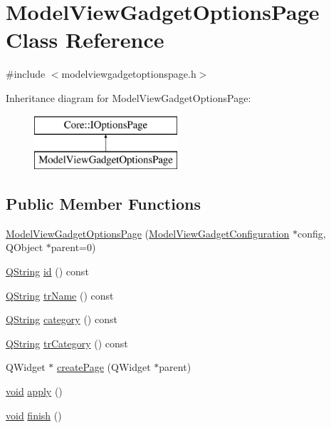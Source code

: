 \hypertarget{class_model_view_gadget_options_page}{\section{\-Model\-View\-Gadget\-Options\-Page \-Class \-Reference}
\label{class_model_view_gadget_options_page}
}


{\ttfamily \#include $<$modelviewgadgetoptionspage.\-h$>$}

\-Inheritance diagram for \-Model\-View\-Gadget\-Options\-Page\-:\begin{figure}[H]
\begin{center}
\leavevmode
\includegraphics[height=2.000000cm]{class_model_view_gadget_options_page}
\end{center}
\end{figure}
\subsection*{\-Public \-Member \-Functions}
\begin{DoxyCompactItemize}
\item 
\hyperlink{group___model_view_plugin_ga86839ae520e5a8d7d38e0349ab8110db}{\-Model\-View\-Gadget\-Options\-Page} (\hyperlink{class_model_view_gadget_configuration}{\-Model\-View\-Gadget\-Configuration} $\ast$config, \-Q\-Object $\ast$parent=0)
\item 
\hyperlink{group___u_a_v_objects_plugin_gab9d252f49c333c94a72f97ce3105a32d}{\-Q\-String} \hyperlink{group___model_view_plugin_ga4ef97dfb27bc7bf0761a6ef8c9992461}{id} () const 
\item 
\hyperlink{group___u_a_v_objects_plugin_gab9d252f49c333c94a72f97ce3105a32d}{\-Q\-String} \hyperlink{group___model_view_plugin_ga957813f49ad4050f6d8fe39c8ddb8db9}{tr\-Name} () const 
\item 
\hyperlink{group___u_a_v_objects_plugin_gab9d252f49c333c94a72f97ce3105a32d}{\-Q\-String} \hyperlink{group___model_view_plugin_ga7ac23d7285b3e6b2541b45329d26d973}{category} () const 
\item 
\hyperlink{group___u_a_v_objects_plugin_gab9d252f49c333c94a72f97ce3105a32d}{\-Q\-String} \hyperlink{group___model_view_plugin_ga0026a37d0b02b743a513a6f79b88928e}{tr\-Category} () const 
\item 
\-Q\-Widget $\ast$ \hyperlink{group___model_view_plugin_ga5a42eda3ce28f2971be7b426347d588a}{create\-Page} (\-Q\-Widget $\ast$parent)
\item 
\hyperlink{group___u_a_v_objects_plugin_ga444cf2ff3f0ecbe028adce838d373f5c}{void} \hyperlink{group___model_view_plugin_ga77c3c23e38d3018c84f464c0ef5402e5}{apply} ()
\item 
\hyperlink{group___u_a_v_objects_plugin_ga444cf2ff3f0ecbe028adce838d373f5c}{void} \hyperlink{group___model_view_plugin_ga9ba47bc802df977b1f8cc5f1c8b70ca3}{finish} ()
\end{DoxyCompactItemize}


